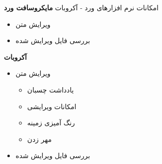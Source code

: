 \documentclass[14pt]{beamer}
\makeatletter
\newcommand{\rtlist}{\raggedleft\rightskip\@totalleftmargin}
\newcommand{\frametitlefontsize}{\fontsize{20pt}{0pt}\selectfont}
\makeatother
\begin{document}
\begin{persian}
	\begin{frame}{\frametitlefontsize امکانات نرم افزارهای ورد - آکروبات}
		\textbf{مایکروسافت ورد}
		\begin{itemize}\rtlist
			\item ویرایش متن
			\item بررسی فایل ویرایش شده
		\end{itemize}
		
		\textbf{آکروبات}
		\begin{itemize}\rtlist
			\item ویرایش متن
			\begin{itemize}\rtlist
				\item یادداشت چسبان
				\item امکانات ویرایشی
				\item رنگ آمیزی زمینه
				\item مهر زدن
			\end{itemize}
			\item بررسی فایل ویرایش شده
		\end{itemize}		
	\end{frame}
	
\end{persian}
\end{document}
